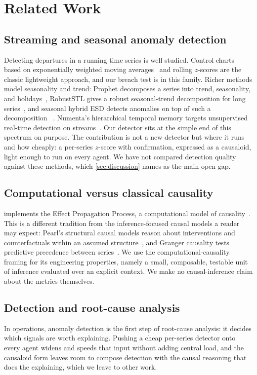 \section{Related Work}
\label{sec:related}

\subsection{Streaming and seasonal anomaly detection}
Detecting departures in a running time series is well studied. Control charts based
on exponentially weighted moving averages~\citep{roberts1959ewma} and rolling
$z$-scores are the classic lightweight approach, and our breach test is in this
family. Richer methods model seasonality and trend: Prophet decomposes a series
into trend, seasonality, and holidays~\citep{taylor2018prophet}, RobustSTL gives a
robust seasonal-trend decomposition for long series~\citep{wen2019robuststl}, and
seasonal hybrid ESD detects anomalies on top of such a decomposition~%
\citep{hochenbaum2017shesd}. Numenta's hierarchical temporal memory targets
unsupervised real-time detection on streams~\citep{ahmad2017htm}. Our detector
sits at the simple end of this spectrum on purpose. The contribution is not a new
detector but where it runs and how cheaply: a per-series $z$-score with
confirmation, expressed as a causaloid, light enough to run on every agent. We have
not compared detection quality against these methods, which \cref{sec:discussion}
names as the main open gap.

\subsection{Computational versus classical causality}
\dc{} implements the Effect Propagation Process, a computational model of
causality~\citep{deepcausality}. This is a different tradition from the
inference-focused causal models a reader may expect: Pearl's structural causal
models reason about interventions and counterfactuals within an assumed
structure~\citep{pearl2009causality}, and Granger causality tests predictive
precedence between series~\citep{granger1969causality}. We use the
computational-causality framing for its engineering properties, namely a small,
composable, testable unit of inference evaluated over an explicit context. We make
no causal-inference claim about the metrics themselves.

\subsection{Detection and root-cause analysis}
In operations, anomaly detection is the first step of root-cause analysis: it
decides which signals are worth explaining. Pushing a cheap per-series detector onto
every agent widens and speeds that input without adding central load, and the
causaloid form leaves room to compose detection with the causal reasoning that does
the explaining, which we leave to other work.
